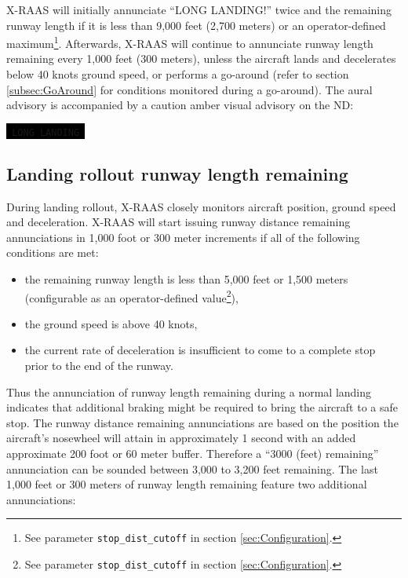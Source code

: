 \documentclass[a4paper,12pt]{article}
\newcommand{\visualadvisory}[3][b]{%
    \ifthenelse{\equal{#1}{b}}{\begin{center}}{}
    \noindent
    \colorbox{black}{\textcolor{#2visualadvisorycolor}{\large\texttt{~#3~}}}
    \ifthenelse{\equal{#1}{b}}{\end{center}}{}}
\newcommand{\confopt}[1]{\texttt{#1}}
\begin{document}
\noindent X-RAAS will initially annunciate ``LONG LANDING!'' twice and
the remaining runway length if it is less than 9,000 feet (2,700 meters)
or an operator-defined maximum\footnote{See parameter
\confopt{stop\_dist\_cutoff} in section \ref{sec:Configuration}.}.
Afterwards, X-RAAS will continue to annunciate runway length remaining
every 1,000 feet (300 meters), unless the aircraft lands and decelerates
below 40 knots ground speed, or performs a go-around (refer to section
\ref{subsec:GoAround} for conditions monitored during a go-around). The
aural advisory is accompanied by a caution amber visual advisory on the
ND:

\visualadvisory{nonroutine}{LONG LANDING}

\subsection{Landing rollout runway length remaining}
\label{subsec:LandRolloutMon}

During landing rollout, X-RAAS closely monitors aircraft position, ground
speed and deceleration. X-RAAS will start issuing runway distance
remaining annunciations in 1,000 foot or 300 meter increments if all of
the following conditions are met:

\begin{itemize}

\item the remaining runway length is less than 5,000 feet or 1,500 meters
(configurable as an operator-defined value\footnote{See parameter
\confopt{stop\_dist\_cutoff} in section \ref{sec:Configuration}.}),

\item the ground speed is above 40 knots,

\item the current rate of deceleration is insufficient to come to a
complete stop prior to the end of the runway.

\end{itemize}

\noindent Thus the annunciation of runway length remaining during a
normal landing indicates that additional braking might be required to
bring the aircraft to a safe stop. The runway distance remaining
annunciations are based on the position the aircraft's nosewheel will
attain in approximately 1 second with an added approximate 200 foot or 60
meter buffer. Therefore a ``3000 (feet) remaining'' annunciation can be
sounded between 3,000 to 3,200 feet remaining. The last 1,000 feet or 300
meters of runway length remaining feature two additional annunciations:
\end{document}
